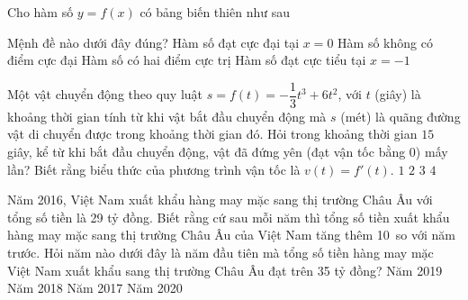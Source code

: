 \begin{ex}%
	Cho hàm số $y=f(x)$ có bảng biến thiên như sau
	\begin{center}
	\end{center}
	Mệnh đề nào dưới đây đúng?
	\choice
	{Hàm số đạt cực đại tại $x=0$}
	{Hàm số không có điểm cực đại}
	{\True Hàm số có hai điểm cực trị}
	{Hàm số đạt cực tiểu tại $x=-1$}
\end{ex}
\begin{ex}%
	Một vật chuyển động theo quy luật $s=f(t)=-\dfrac{1}{3}t^3+6t^2$, với $t$ (giây) là khoảng thời gian tính từ khi vật bắt đầu chuyển động mà $s$ (mét) là quãng đường vật di chuyển được trong khoảng thời gian  đó. Hỏi trong khoảng thời gian $15$ giây, kể từ khi bắt đầu chuyển động, vật đã đứng yên (đạt vận tốc bằng 0) mấy lần? Biết rằng biểu thức của phương trình vận tốc là $v(t)=f'(t)$.
	\choice
	{\True $1$}
	{$2$}
	{$3$}
	{$4$}
\end{ex}
\begin{ex}%
	Năm 2016, Việt Nam xuất khẩu hàng may mặc sang thị trường Châu Âu với tổng số tiền là 29 tỷ đồng. Biết rằng cứ sau mỗi năm thì tổng số tiền xuất khẩu hàng may mặc sang thị trường Châu Âu của Việt Nam tăng thêm 10\  so với năm trước. Hỏi năm nào dưới đây là năm đầu tiên mà tổng số tiền hàng may mặc Việt Nam xuất khẩu sang thị trường Châu Âu đạt trên 35 tỷ đồng?
	\choice 
	{Năm 2019}
	{\True Năm 2018}
	{Năm 2017}
	{Năm 2020}
\end{ex}

